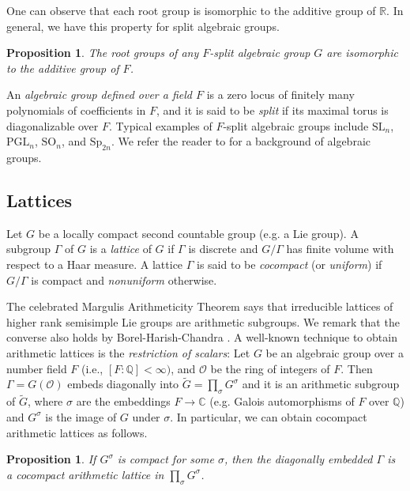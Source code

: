 \documentclass[letterpaper, reqno, 11pt]{amsart}
\newtheorem{proposition}[theorem]{Proposition}
\theoremstyle{definition}
\theoremstyle{definition}
\theoremstyle{remark}
\newcommand{\Ga}{\Gamma}
\newcommand{\cal}{\mathcal}
\begin{document}
One can observe that each root group is isomorphic to the additive group of $\mathbb{R}$. In general, we have this property for split algebraic groups.
\begin{proposition} %
    The root groups of any $F$-split algebraic group $G$ are isomorphic to the additive group of $F$.
\end{proposition}

 An \textit{algebraic group defined over a field $F$} is a zero locus of finitely many polynomials of coefficients in $F$, and it is said to be \textit{split} if its maximal torus is diagonalizable over $F$. Typical examples of $F$-split algebraic groups include $\mathrm{SL}_n$, $\mathrm{PGL}_n$, $\mathrm{SO}_n$, and $\mathrm{Sp}_{2n}$. We refer the reader to \cite{onishchik2012lie} for a background of algebraic groups.

\subsection{Lattices}
Let $G$ be a locally compact second countable group (e.g. a Lie group). A subgroup $\Ga$ of $G$ is a \textit{lattice} of $G$ if $\Ga$ is discrete and $G/\Ga$ has finite volume with respect to a Haar measure. A lattice $\Ga$ is said to be \textit{cocompact} (or \textit{uniform}) if $G/\Ga$ is compact and \textit{nonuniform} otherwise.

The celebrated Margulis Arithmeticity Theorem \cite{margulis1991discrete} says that irreducible lattices of higher rank semisimple Lie groups are arithmetic subgroups. We remark that the converse also holds by Borel-Harish-Chandra \cite{borel1962arithmetic}. A well-known technique to obtain arithmetic lattices is the \textit{restriction of scalars}: Let $G$ be an algebraic group over a number field $F$ (i.e., $[F:\mathbb{Q}] < \infty)$, and $\cal{O}$ be the ring of integers of $F$. Then $\Ga=G(\cal{O})$ embeds diagonally into $\tilde{G}=\prod_{\sigma}G^\sigma$ and it is an arithmetic subgroup of $\tilde{G}$, where $\sigma$ are the embeddings $F \to \mathbb{C}$ (e.g.
Galois automorphisms of $F$ over $\mathbb{Q}$) and $G^{\sigma}$ is the image of $G$ under $\sigma$. In particular, we can obtain cocompact arithmetic lattices as follows.

\begin{proposition} \cite[Corollary 5.5.10, Appendix C]{morris2015introduction}
    If $G^\sigma$ is compact for some $\sigma$, then the diagonally embedded $\Ga$ is a cocompact arithmetic lattice in $\prod_{\sigma}G^\sigma$.
\end{proposition}
\end{document}
